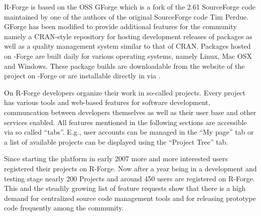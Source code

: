 R-Forge is based on the OSS GForge \citep{forge:copeland_et_al:2006} which is a
fork of the 2.61 SourceForge code maintained by one of the authors of
the original SourceForge code Tim Perdue. GForge has been modified to
provide additional features for the \R{} community namely a
CRAN-style repository for hosting development releases of \R{}
packages as well as a quality management system similar to that of
CRAN.
Packages hosted on \R{}-Forge are built daily
for various operating systems, namely Linux, Mac OSX and Windows. These
package builds are downloadable from the website of the project on
\R{}-Forge or are installable directly in \R{} via
.






On R-Forge developers organize their work
in so-called projects. Every project has various tools and web-based features
for software development, communcation between developers themselves
as well as their
user base and other services enabled. All features mentioned in the
following sections are accessible via so called 
``tabs''. E.g., user accounts can be managed in the ``My page'' tab or
a list of available projects can be displayed using the ``Project Tree'' tab. 

Since starting the platform in early 2007 more
and more interested users registered their projects on R-Forge. Now
after a year being in a development and testing stage nearly
200 Projects and around 450  
users are registered on R-Forge. This and the steadily growing list of
feature requests show that there is a high demand for centralized source code
management tools and for releasing prototype code frequently among the
\R{} community.

